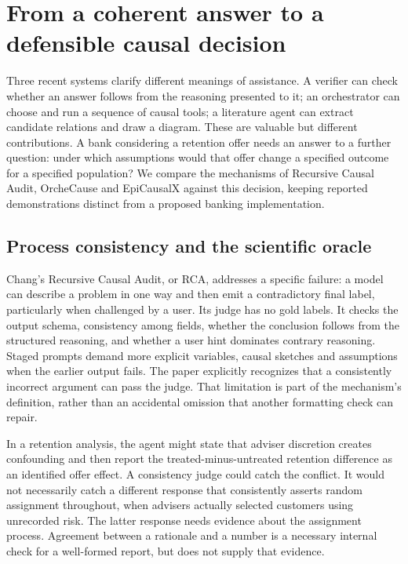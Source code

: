 \section{From a coherent answer to a defensible causal decision}
\label{exec17:frontier-start}

Three recent systems clarify different meanings of assistance. A verifier can
check whether an answer follows from the reasoning presented to it; an
orchestrator can choose and run a sequence of causal tools; a literature agent
can extract candidate relations and draw a diagram. These are valuable but
different contributions. A bank considering a retention offer needs an answer
to a further question: under which assumptions would that offer change a
specified outcome for a specified population? We compare the mechanisms of
Recursive Causal Audit, OrcheCause and EpiCausalX against this decision, keeping
reported demonstrations distinct from a proposed banking implementation.
\citep{exec17_frontier_chang,exec17_frontier_yang,exec17_frontier_liu}

\subsection{Process consistency and the scientific oracle}

Chang's Recursive Causal Audit, or RCA, addresses a specific failure: a model
can describe a problem in one way and then emit a contradictory final label,
particularly when challenged by a user. Its judge has no gold labels. It checks
the output schema, consistency among fields, whether the conclusion follows
from the structured reasoning, and whether a user hint dominates contrary
reasoning. Staged prompts demand more explicit variables, causal sketches and
assumptions when the earlier output fails. The paper explicitly recognizes
that a consistently incorrect argument can pass the judge. That limitation is
part of the mechanism's definition, rather than an accidental omission that
another formatting check can repair.~\citep{exec17_frontier_chang}

In a retention analysis, the agent might state that adviser discretion creates
confounding and then report the treated-minus-untreated retention difference
as an identified offer effect. A consistency judge could catch the conflict.
It would not necessarily catch a different response that consistently asserts
random assignment throughout, when advisers actually selected customers using
unrecorded risk. The latter response needs evidence about the assignment
process. Agreement between a rationale and a number is a necessary internal
check for a well-formed report, but does not supply that evidence.

